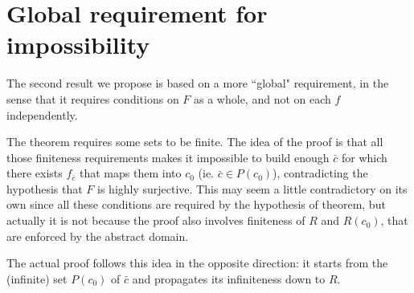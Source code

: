 \section{Global requirement for impossibility}
The second result we propose is based on a more ``global" requirement, in the sense that it requires conditions on $F$ as a whole, and not on each $f$ independently.

The theorem requires some sets to be finite. The idea of the proof is that all those finiteness requirements makes it impossible to build enough $\bar{c}$ for which there exists $f_{\bar{c}}$ that maps them into $c_0$ (ie. $\bar{c} \in P(c_0)$), contradicting the hypothesis that $F$ is highly surjective. This may seem a little contradictory on its own since all these conditions are required by the hypothesis of theorem, but actually it is not because the proof also involves finiteness of $R$ and $R(c_0)$, that are enforced by the abstract domain.

The actual proof follows this idea in the opposite direction: it starts from the (infinite) set $P(c_0)$ of $\bar{c}$ and propagates its infiniteness down to $R$.

